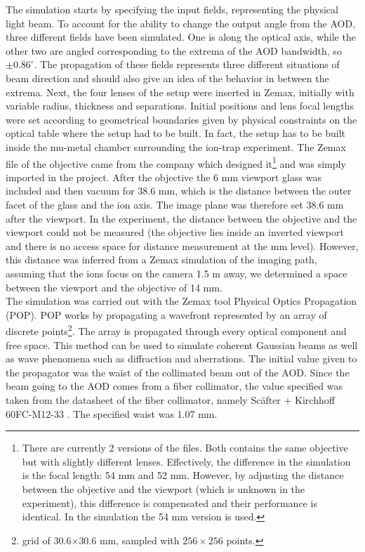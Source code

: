 The simulation starts by specifying the input fields, representing the physical light beam. To account for the ability to change the output angle from the AOD, three different fields have been simulated. One is along the optical axis, while the other two are angled corresponding to the extrema of the AOD bandwidth, so $\pm0.86^{\circ}$. The propagation of these fields represents three different situations of beam direction and should also give an idea of the behavior in between the extrema. Next, the four lenses of the setup were inserted in Zemax, initially with variable radius, thickness and separations. Initial positions and lens focal lengths were set according to geometrical boundaries given by physical constraints on the optical table where the setup had to be built. In fact, the  setup has to be built inside the mu-metal chamber surrounding the ion-trap experiment. The Zemax file of the objective came from the company which designed it\footnote{There are currently 2 versions of the files. Both contains the same objective but with slightly different lenses. Effectively, the difference in the simulation is the focal length: 54 mm and 52 mm. However, by adjusting the distance between the objective and the viewport (which is unknown in the experiment), this difference is compensated and their performance is identical. In the simulation the 54 mm version is used.} and was simply imported in the project. After the objective the 6 mm viewport glass was included and then vacuum for 38.6 mm, which is the distance between the outer facet of the glass and the ion axis. The image plane was therefore set 38.6 mm after the viewport. In the experiment, the distance between the objective and the viewport could not be measured (the objective lies inside an inverted viewport and there is no access space for distance measurement at the mm level). However, this distance was inferred from a Zemax simulation of the imaging path, assuming that the ions focus on the camera 1.5 m away, we determined a space between the viewport and the objective of 14 mm.\\
The simulation was carried out with the Zemax tool Physical Optics Propagation (POP). POP works by propagating a wavefront represented by an array of discrete points\footnote{grid of 30.6$\times$30.6 mm, sampled with $256\times256$ points.}. The array is propagated through every optical component and free space. This method can be used to simulate coherent Gaussian beams as well as wave phenomena such as diffraction and aberrations. The initial value given to the propagator was the waist of the collimated beam out of the AOD. Since the beam going to the AOD comes from a fiber collimator, the value specified was taken from the datasheet of the fiber collimator, namely Sc\"after + Kirchhoff 60FC-M12-33 \cite{fibercollimator}. The specified waist was 1.07 mm.
